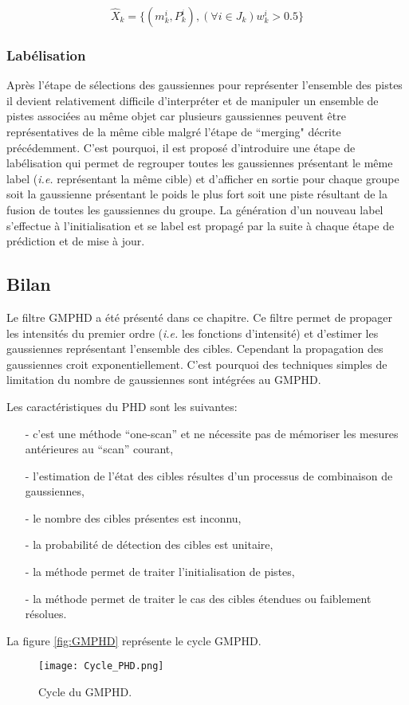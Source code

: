 \documentclass[10pt,french,a4paper]{report}
\begin{document}
\begin{equation}
\hat{X}_k=\{(m_k^i, P_k^i),(\forall i \in J_k) w_k^i>0.5\}
\end{equation}

\subsubsection{Labélisation}
	 Après l'étape de sélections des gaussiennes pour représenter l'ensemble des pistes il devient relativement difficile d'interpréter et de manipuler un ensemble de pistes associées au même objet car plusieurs gaussiennes peuvent être représentatives de la même cible malgré l'étape de ``merging" décrite précédemment. C'est pourquoi, il est proposé d'introduire une étape de labélisation qui permet de regrouper toutes les gaussiennes présentant le même label (\textit{i.e.} représentant la même cible) et d'afficher en sortie pour chaque groupe soit la gaussienne présentant le poids le plus fort soit une piste résultant de la fusion de toutes les gaussiennes du groupe. La génération d'un nouveau label s'effectue à l'initialisation et se label est propagé par la suite à chaque étape de prédiction et de mise à jour.    
	 
\subsection{Bilan}
Le filtre \ac{GMPHD} a été présenté dans ce chapitre. Ce filtre permet de propager les intensités du premier ordre (\textit{i.e.} les fonctions d'intensité) et d'estimer les gaussiennes représentant l'ensemble des cibles. Cependant la propagation des gaussiennes croit exponentiellement. C'est pourquoi des techniques simples de limitation du nombre de gaussiennes sont intégrées au \ac{GMPHD}. 

Les caractéristiques du \ac{PHD} sont les suivantes:
\begin{itemize}
\item[-]c'est une méthode  ``one-scan'' et ne nécessite pas de mémoriser les mesures antérieures au ``scan'' courant,
\item[-]l'estimation de l'état des cibles résultes d'un processus de combinaison de gaussiennes,
\item[-]le nombre des cibles présentes est inconnu,
\item[-]la probabilité de détection des cibles est unitaire,
\item[-]la méthode permet de traiter l'initialisation de pistes,
\item[-]la méthode permet de traiter le cas des cibles étendues ou faiblement résolues.
\end{itemize}
La figure \ref{fig:GMPHD} représente le cycle \ac{GMPHD}. 
\begin{center}
\begin{figure}
\label{fig:SDA}
\texttt{[image: Cycle\_PHD.png]} 
\caption{Cycle du \ac{GMPHD}.}
\end{figure}		 
\end{center}
\end{document}
